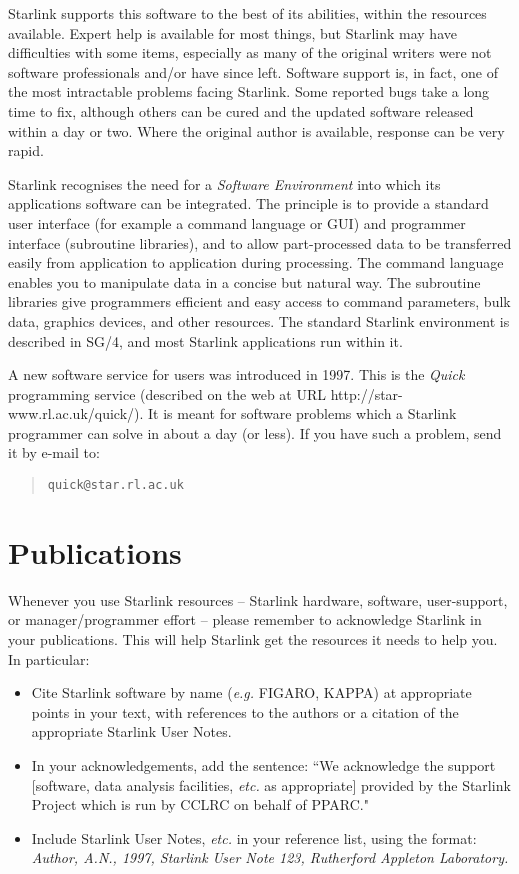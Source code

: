 \documentclass[twoside]{article}
\newcommand{\htmladdnormallink}[2]{#1}
\newcommand{\xref}[3]{#1}
\begin{document}
Starlink supports this software to the best of its abilities, within the
resources available.
Expert help is available for most things, but Starlink may have difficulties
with some items, especially as many of the original writers were not software
professionals and/or have since left.
Software support is, in fact, one of the most intractable problems facing
Starlink.
Some reported bugs take a long time to fix, although others can be cured
and the updated software released within a day or two.
Where the original author is available, response can be very rapid.

Starlink recognises the need for a {\em Software Environment}\/ into which its
applications software can be integrated.
The principle is to provide a standard user interface (for example a command
language or GUI) and programmer interface (subroutine libraries), and to allow
part-processed data to be transferred easily from application to application
during processing.
The command language enables you to manipulate data in a concise but natural
way.
The subroutine libraries give programmers efficient and easy access to
command parameters, bulk data, graphics devices, and other resources.
The standard Starlink environment is described in
\xref{SG/4}{sg4}{},
and most Starlink applications run within it.

A new software service for users was introduced in 1997.
This is the {\em Quick}\/ programming service (described on the web at URL
\htmladdnormallink{http://star-www.rl.ac.uk/quick/}
{http://star-www.rl.ac.uk/quick/}).
It is meant for software problems which a Starlink programmer can solve in
about a day (or less).
If you have such a problem, send it by e-mail to:
\begin{quote}
{\tt quick@star.rl.ac.uk}
\end{quote}

\newpage

\section{Publications}

Whenever you use Starlink resources -- Starlink hardware, software,
user-support, or manager/programmer effort -- please remember to acknowledge
Starlink in your publications.
This will help Starlink get the resources it needs to help you.
In particular:
\begin{itemize}
\item Cite Starlink software by name ({\em e.g.}\/ FIGARO, KAPPA) at
appropriate points in your text, with references to the authors or a citation
of the appropriate Starlink User Notes.
\item In your acknowledgements, add the sentence: ``We acknowledge the support
[software, data analysis facilities, {\em etc.}\/ as appropriate] provided
by the Starlink Project which is run by CCLRC on behalf of PPARC."
\item Include Starlink User Notes, {\em etc.}\/ in your reference list, using
the format:\\
{\em Author, A.N., 1997, Starlink User Note 123, Rutherford Appleton
Laboratory.}
\end{itemize}
\end{document}

